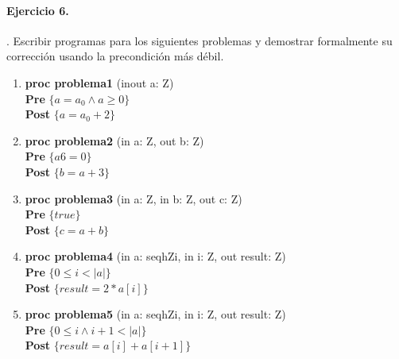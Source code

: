 \documentclass{article}
\begin{document}
\paragraph{Ejercicio 6.}. Escribir programas para los siguientes problemas y demostrar 
formalmente su corrección usando la precondición
más débil.

\begin{enumerate}[label=\alph*)]
\item \textbf{proc problema1 }(inout a: Z) {\\
   \hspace*{6mm} \textbf{Pre }$\{a = a_0 \wedge a \geq 0\}$\\
   \hspace*{6mm} \textbf{Post }$\{a = a_0 + 2\}$\\
   }

\item \textbf{proc problema2 }(in a: Z, out b: Z) {\\
   \hspace*{6mm} \textbf{Pre }$\{a 6= 0\}$\\
   \hspace*{6mm} \textbf{Post }$\{b = a + 3\}$\\
   }

\item \textbf{proc problema3 }(in a: Z, in b: Z, out c: Z) {\\
   \hspace*{6mm} \textbf{Pre }$\{true\}$\\
   \hspace*{6mm} \textbf{Post }$\{c = a + b\}$\\
   }

\item \textbf{proc problema4 }(in a: seqhZi, in i: Z, out result: Z) {\\
   \hspace*{6mm} \textbf{Pre }$\{0 \leq i < |a|\}$\\
   \hspace*{6mm} \textbf{Post }$\{result = 2 * a[i]\}$\\
   }

\item \textbf{proc problema5 }(in a: seqhZi, in i: Z, out result: Z) {\\
   \hspace*{6mm} \textbf{Pre }$\{0 \leq i \wedge i + 1 < |a|\}$\\
   \hspace*{6mm} \textbf{Post }$\{result = a[i] + a[i + 1]\}$\\
   }
\end{enumerate}
\end{document}
